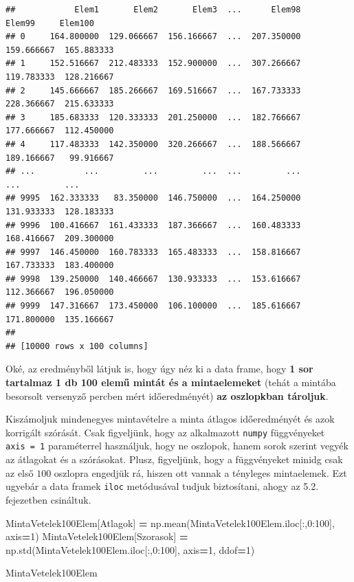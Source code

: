 \documentclass[
]{book}
\newenvironment{Shaded}{\begin{snugshade}}{\end{snugshade}}
\newcommand{\DecValTok}[1]{\textcolor[rgb]{0.00,0.00,0.81}{#1}}
\newcommand{\NormalTok}[1]{#1}
\newcommand{\OperatorTok}[1]{\textcolor[rgb]{0.81,0.36,0.00}{\textbf{#1}}}
\newcommand{\StringTok}[1]{\textcolor[rgb]{0.31,0.60,0.02}{#1}}
\begin{document}
\begin{verbatim}
##            Elem1       Elem2       Elem3  ...      Elem98      Elem99     Elem100
## 0     164.800000  129.066667  156.166667  ...  207.350000  159.666667  165.883333
## 1     152.516667  212.483333  152.900000  ...  307.266667  119.783333  128.216667
## 2     145.666667  185.266667  169.516667  ...  167.733333  228.366667  215.633333
## 3     185.683333  120.333333  201.250000  ...  182.766667  177.666667  112.450000
## 4     117.483333  142.350000  320.266667  ...  188.566667  189.166667   99.916667
## ...          ...         ...         ...  ...         ...         ...         ...
## 9995  162.333333   83.350000  146.750000  ...  164.250000  131.933333  128.183333
## 9996  100.416667  161.433333  187.366667  ...  160.483333  168.416667  209.300000
## 9997  146.450000  160.783333  165.483333  ...  158.816667  167.733333  183.400000
## 9998  139.250000  140.466667  130.933333  ...  153.616667  112.366667  196.050000
## 9999  147.316667  173.450000  106.100000  ...  185.616667  171.800000  135.166667
## 
## [10000 rows x 100 columns]
\end{verbatim}

Oké, az eredményből látjuk is, hogy úgy néz ki a data frame, hogy \textbf{1 sor tartalmaz 1 db 100 elemű mintát és a mintaelemeket} (tehát a mintába besorsolt versenyző percben mért időeredményét) \textbf{az oszlopkban tároljuk}.

Kiszámoljuk mindenegyes mintavételre a minta átlagos időeredményét és azok korrigált szórását. Csak figyeljünk, hogy az alkalmazott \texttt{numpy} függvényeket \texttt{axis\ =\ 1} paraméterrel használjuk, hogy ne oszlopok, hanem sorok szerint vegyék az átlagokat és a szórásokat. Plusz, figyeljünk, hogy a függvényeket minidg csak az első \(100\) oszlopra engedjük rá, hiszen ott vannak a tényleges mintaelemek. Ezt ugyebár a data framek \texttt{iloc} metódusával tudjuk biztosítani, ahogy az 5.2. fejezetben csináltuk.

\begin{Shaded}
\begin{Highlighting}[]
\NormalTok{MintaVetelek100Elem[}\StringTok{\textquotesingle{}Atlagok\textquotesingle{}}\NormalTok{] }\OperatorTok{=}\NormalTok{ np.mean(MintaVetelek100Elem.iloc[:,}\DecValTok{0}\NormalTok{:}\DecValTok{100}\NormalTok{], axis}\OperatorTok{=}\DecValTok{1}\NormalTok{)}
\NormalTok{MintaVetelek100Elem[}\StringTok{\textquotesingle{}Szorasok\textquotesingle{}}\NormalTok{] }\OperatorTok{=}\NormalTok{ np.std(MintaVetelek100Elem.iloc[:,}\DecValTok{0}\NormalTok{:}\DecValTok{100}\NormalTok{], axis}\OperatorTok{=}\DecValTok{1}\NormalTok{, ddof}\OperatorTok{=}\DecValTok{1}\NormalTok{)}

\NormalTok{MintaVetelek100Elem}
\end{Highlighting}
\end{Shaded}
\end{document}
